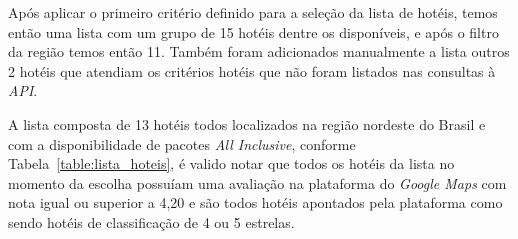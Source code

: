 Após aplicar o primeiro critério definido para a seleção da lista de hotéis, temos então uma lista com um grupo de 15 hotéis dentre os disponíveis, e após o filtro da região temos então 11. Também foram adicionados manualmente a lista outros 2 hotéis que atendiam os critérios hotéis que não foram listados nas consultas à \textit{API}.

A lista composta de 13 hotéis todos localizados na região nordeste do Brasil e com a disponibilidade de pacotes \textit{All Inclusive}, conforme Tabela~\ref{table:lista_hoteis}, é valido notar que todos os hotéis da lista no momento da escolha possuíam uma avaliação na plataforma do \textit{Google Maps} com nota igual ou superior a 4,20 e são todos hotéis apontados pela plataforma como sendo hotéis de classificação de 4 ou 5 estrelas.

